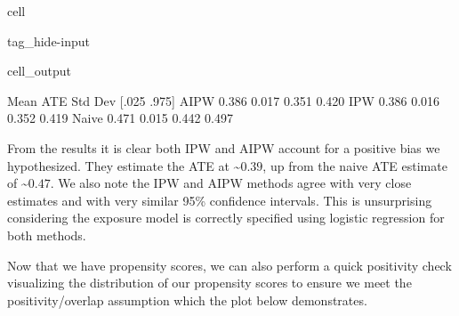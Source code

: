 \documentclass[letterpaper,10pt,english]{jupyterBook}
\begin{document}
\begin{sphinxuseclass}{cell}
\begin{sphinxuseclass}{tag_hide-input}\begin{sphinxVerbatimOutput}

\begin{sphinxuseclass}{cell_output}
\begin{sphinxVerbatim}[commandchars=\\\{\}]
       Mean ATE  Std Dev  [.025  .975]
AIPW      0.386    0.017  0.351  0.420
IPW       0.386    0.016  0.352  0.419
Naive     0.471    0.015  0.442  0.497
\end{sphinxVerbatim}

\noindent{}

\end{sphinxuseclass}\end{sphinxVerbatimOutput}

\end{sphinxuseclass}
\end{sphinxuseclass}
\sphinxAtStartPar
From the results it is clear both IPW and AIPW account for a positive bias we hypothesized. They estimate the ATE at \textasciitilde{}\(0.39\), up from the naive ATE estimate of \textasciitilde{}\(0.47\). We also note the IPW and AIPW methods agree with very close estimates and with very similar 95\% confidence intervals. This is unsurprising considering the exposure model is correctly specified using logistic regression for both methods.

\sphinxAtStartPar
Now that we have propensity scores, we can also perform a quick positivity check visualizing the distribution of our propensity scores to ensure we meet the positivity/overlap assumption which the plot below demonstrates.
\end{document}
